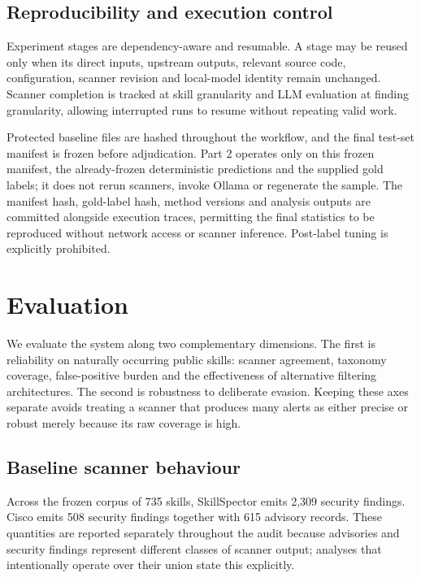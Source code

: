 \documentclass[conference]{IEEEtran}
\begin{document}
\subsection{Reproducibility and execution control}

Experiment stages are dependency-aware and resumable. A stage may be reused only when its direct inputs, upstream outputs, relevant source code, configuration, scanner revision and local-model identity remain unchanged. Scanner completion is tracked at skill granularity and LLM evaluation at finding granularity, allowing interrupted runs to resume without repeating valid work.

Protected baseline files are hashed throughout the workflow, and the final test-set manifest is frozen before adjudication. Part 2 operates only on this frozen manifest, the already-frozen deterministic predictions and the supplied gold labels; it does not rerun scanners, invoke Ollama or regenerate the sample. The manifest hash, gold-label hash, method versions and analysis outputs are committed alongside execution traces, permitting the final statistics to be reproduced without network access or scanner inference. Post-label tuning is explicitly prohibited.

\section{Evaluation}

We evaluate the system along two complementary dimensions. The first is reliability on naturally occurring public skills: scanner agreement, taxonomy coverage, false-positive burden and the effectiveness of alternative filtering architectures. The second is robustness to deliberate evasion. Keeping these axes separate avoids treating a scanner that produces many alerts as either precise or robust merely because its raw coverage is high.

\subsection{Baseline scanner behaviour}

Across the frozen corpus of 735 skills, SkillSpector emits 2,309 security findings. Cisco emits 508 security findings together with 615 advisory records. These quantities are reported separately throughout the audit because advisories and security findings represent different classes of scanner output; analyses that intentionally operate over their union state this explicitly.
\end{document}
